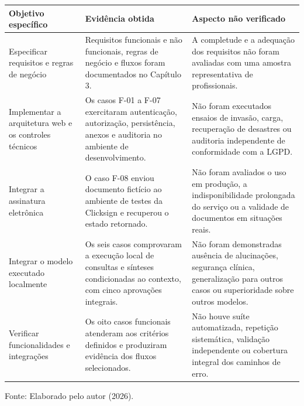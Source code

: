 \begin{quadro}[H]
\centering
\caption{Relação entre objetivos, resultados e aspectos não verificados}
\label{qua:objetivos-resultados}
\footnotesize
\renewcommand{\arraystretch}{1.16}
\setlength{\tabcolsep}{4pt}
\begin{tabularx}{\textwidth}{|>{\raggedright\arraybackslash}p{3.2cm}|>{\raggedright\arraybackslash}X|>{\raggedright\arraybackslash}X|}
\hline
\textbf{Objetivo específico} & \textbf{Evidência obtida} & \textbf{Aspecto não verificado} \\ \hline
Especificar requisitos e regras de negócio & Requisitos funcionais e não funcionais, regras de negócio e fluxos foram documentados no Capítulo 3. & A completude e a adequação dos requisitos não foram avaliadas com uma amostra representativa de profissionais. \\ \hline
Implementar a arquitetura web e os controles técnicos & Os casos F-01 a F-07 exercitaram autenticação, autorização, persistência, anexos e auditoria no ambiente de desenvolvimento. & Não foram executados ensaios de invasão, carga, recuperação de desastres ou auditoria independente de conformidade com a LGPD. \\ \hline
Integrar a assinatura eletrônica & O caso F-08 enviou documento fictício ao ambiente de testes da Clicksign e recuperou o estado retornado. & Não foram avaliados o uso em produção, a indisponibilidade prolongada do serviço ou a validade de documentos em situações reais. \\ \hline
Integrar o modelo executado localmente & Os seis casos comprovaram a execução local de consultas e sínteses condicionadas ao contexto, com cinco aprovações integrais. & Não foram demonstradas ausência de alucinações, segurança clínica, generalização para outros casos ou superioridade sobre outros modelos. \\ \hline
Verificar funcionalidades e integrações & Os oito casos funcionais atenderam aos critérios definidos e produziram evidência dos fluxos selecionados. & Não houve suíte automatizada, repetição sistemática, validação independente ou cobertura integral dos caminhos de erro. \\ \hline
\end{tabularx}
\par\vspace{0.6em}
\begin{flushleft}
\footnotesize Fonte: Elaborado pelo autor (2026).
\end{flushleft}
\end{quadro}

